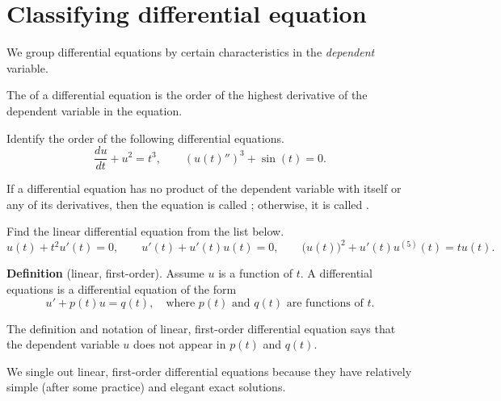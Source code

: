 \documentclass[../main.tex]{subfiles}
\begin{document}
 \section{Classifying differential equation}

We group differential equations by certain characteristics in the \emph{dependent} variable.

\begin{definition}[order]
The  of a differential equation is the order of the highest derivative of the dependent variable in the equation.
\end{definition}
\begin{example}
  Identify the order of the following differential equations.
  \[
    \frac{du}{dt} + u^{2} = t^{3}, 
    \qquad
    \left(u(t)''\right)^{3} + \sin(t) = 0.
  \]
\end{example}

\begin{definition}
  If a differential equation has no product of the dependent variable with itself or any of its derivatives, then the equation is called ; otherwise, it is called . 
\end{definition}
\begin{example}
  Find the linear differential equation from the list below.
  \[
    u(t) + t^{2} u'(t) = 0,
    \qquad
    u'(t) + u'(t) u(t) = 0,
    \qquad
    \big(u(t)\big)^{2} + u'(t) u^{(5)}(t) = t u(t).
  \]
\end{example}

\begin{definition}
  \textbf{Definition} (linear, first-order). Assume \(u\) is a function of \(t\). A  differential equations is a differential equation of the form
  \[
    u' + p(t) u = q(t), \quad\text{where \(p(t)\) and \(q(t)\) are functions of \(t\)}.
  \]
\end{definition}

\faExclamationTriangle{} The definition and notation of linear, first-order differential equation says that the dependent variable \(u\) does not appear in \(p(t)\) and \(q(t)\).

We single out linear, first-order differential equations because they have relatively simple (after some practice) and elegant exact solutions. 
\end{document}
